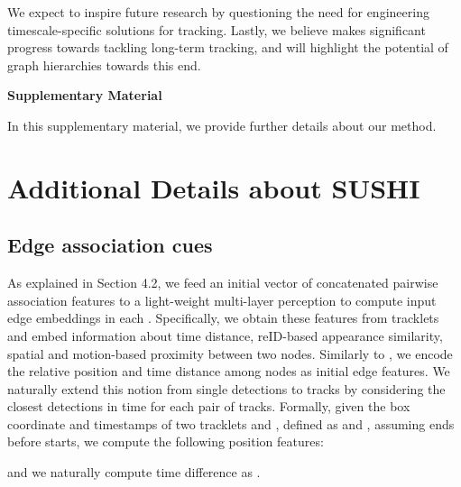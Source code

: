 \documentclass[10pt,twocolumn,letterpaper]{article}
\begin{document}
{{We expect \modelname to inspire future research by questioning the need for engineering timescale-specific solutions for tracking. Lastly, we believe \modelname makes significant progress towards tackling long-term tracking, and will highlight the potential of graph hierarchies towards this end.



 
\smallskip
















\newpage
{\small


}

\clearpage
\appendix

\textbf{{\Large Supplementary Material}}
\newline






In this supplementary material, we provide further details about our method. 


\section{Additional Details about SUSHI }\label{sec:method_supplementary} 
\subsection{Edge association cues}
As explained in Section 4.2, we feed an initial vector of concatenated pairwise association features to a light-weight multi-layer perception  to compute input edge embeddings in each \blockname. Specifically, we obtain these features from tracklets and embed information about time distance, reID-based appearance similarity, spatial and motion-based proximity between two nodes. 
 Similarly to \cite{mpntrack}, we encode the relative position and time distance among nodes as initial edge features. We naturally extend this notion from single detections to tracks by considering the closest detections in time for each pair of tracks. Formally, given the box coordinate and timestamps of two tracklets  and , defined as 
 and
, assuming  \ie  ends before  starts, we compute the following position features:
 
and we naturally compute time difference as .


}}
\end{document}
